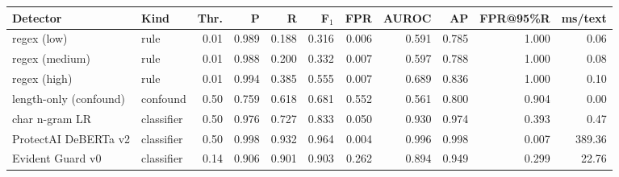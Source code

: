 \begin{tabular}{@{}llrrrrrrrrr@{}}
\toprule
Detector & Kind & Thr. & P & R & F$_1$ & FPR & AUROC & AP & FPR@95\%R & ms/text \\
\midrule
regex (low) & rule & 0.01 & 0.989 & 0.188 & 0.316 & 0.006 & 0.591 & 0.785 & 1.000 & 0.06 \\
regex (medium) & rule & 0.01 & 0.988 & 0.200 & 0.332 & 0.007 & 0.597 & 0.788 & 1.000 & 0.08 \\
regex (high) & rule & 0.01 & 0.994 & 0.385 & 0.555 & 0.007 & 0.689 & 0.836 & 1.000 & 0.10 \\
length-only (confound) & confound & 0.50 & 0.759 & 0.618 & 0.681 & 0.552 & 0.561 & 0.800 & 0.904 & 0.00 \\
char n-gram LR & classifier & 0.50 & 0.976 & 0.727 & 0.833 & 0.050 & 0.930 & 0.974 & 0.393 & 0.47 \\
ProtectAI DeBERTa v2 & classifier & 0.50 & 0.998 & 0.932 & 0.964 & 0.004 & 0.996 & 0.998 & 0.007 & 389.36 \\
Evident Guard v0 & classifier & 0.14 & 0.906 & 0.901 & 0.903 & 0.262 & 0.894 & 0.949 & 0.299 & 22.76 \\
\bottomrule
\end{tabular}
